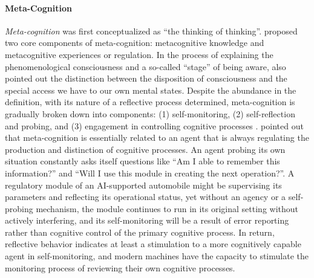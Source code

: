 \paragraph{Meta-Cognition}
\textit{Meta-cognition} was first conceptualized as ``the thinking of thinking''. \citep{flavell1979metacognition} proposed two core components of meta-cognition: metacognitive knowledge and metacognitive experiences or regulation. In the process of explaining the phenomenological consciousness and a so-called ``stage'' of being aware, \citet{Rosenthal1986-ROSTCO} also pointed out the distinction between the disposition of consciousness and the special access we have to our own mental states. Despite the abundance in the definition, with its nature of a reflective process determined, meta-cognition is gradually broken down into components: (1) self-monitoring, (2) self-reflection and probing, and (3) engagement in controlling cognitive processes \citep{efklides2001metacognitive, dunlosky2008metacognition, dunlosky2013handbook, proust2013philosophy, fleur2021metacognition}. \citet{proust2013philosophy} pointed out that meta-cognition is essentially related to an agent that is always regulating the production and distinction of cognitive processes. An agent probing its own situation constantly asks itself questions like ``Am I able to remember this information?'' and ``Will I use this module in creating the next operation?''. A regulatory module of an AI-supported automobile might be supervising its parameters and reflecting its operational status, yet without an agency or a self-probing mechanism, the module continues to run in its original setting without actively interfering, and its self-monitoring will be a result of error reporting rather than cognitive control of the primary cognitive process. In return, reflective behavior indicates at least a stimulation to a more cognitively capable agent in self-monitoring, and modern machines have the capacity to stimulate the monitoring process of reviewing their own cognitive processes.




